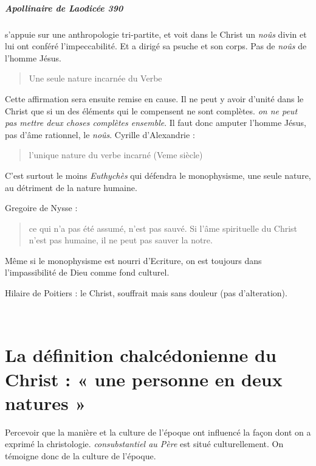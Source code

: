 \subparagraph{Apollinaire de Laodicée 390} s'appuie sur une anthropologie tri-partite, et voit dans le Christ un \textit{noûs} divin et lui ont conféré l'impeccabilité. Et a dirigé sa psuche et son corps. Pas de \textit{noûs} de l'homme Jésus. 
\begin{quote}
    Une seule nature incarnée du Verbe
\end{quote}
Cette affirmation sera ensuite remise en cause. Il ne peut y avoir d'unité dans le Christ que si un des éléments qui le compensent ne sont complètes. \textit{on ne peut pas mettre deux choses complètes ensemble}. Il faut donc amputer l'homme Jésus, pas d'âme rationnel, le \textit{noûs}.
Cyrille d'Alexandrie : 
\begin{quote}
    l'unique nature du verbe incarné (Veme siècle)
\end{quote}

C'est surtout le moins \textit{Euthychès} qui défendra le monophysisme, une seule nature, au détriment de la nature humaine.

  
  \begin{Synthesis}
       Gregoire de Nysse : 
       \begin{quote}
           ce qui n'a pas été assumé, n'est pas sauvé. Si l'âme spirituelle du Christ n'est pas humaine, il ne peut pas sauver la notre.
       \end{quote}
       Même si le monophysisme est nourri d'Ecriture, on est toujours dans l'impassibilité de Dieu comme fond culturel.
  \end{Synthesis}
  
  Hilaire de Poitiers : le Christ, souffrait mais sans douleur (pas d'alteration).
    
  
    
  
    
  
 ~
  \hypertarget{la-duxe9finition-chalcuxe9donienne-du-christ-une-personne-en-deux-natures}{%
  \section{La définition chalcédonienne du Christ : « une personne en
  deux natures
  »}\label{la-duxe9finition-chalcuxe9donienne-du-christ-une-personne-en-deux-natures}}

  
  Percevoir que la manière et la culture de l'époque ont influencé la façon dont on a exprimé la christologie. \textit{consubstantiel au Père} est situé culturellement. On témoigne donc de la culture de l'époque. 
  

